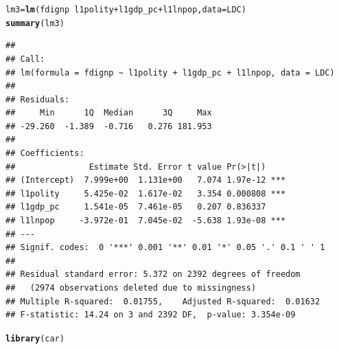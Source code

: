 \documentclass[12pt]{article}\usepackage[]{graphicx}\usepackage[]{color}
\makeatletter
\newcommand{\hlopt}[1]{\textcolor[rgb]{0,0,0}{#1}}%
\newcommand{\hlstd}[1]{\textcolor[rgb]{0.345,0.345,0.345}{#1}}%
\newcommand{\hlkwb}[1]{\textcolor[rgb]{0.69,0.353,0.396}{#1}}%
\newcommand{\hlkwc}[1]{\textcolor[rgb]{0.333,0.667,0.333}{#1}}%
\newcommand{\hlkwd}[1]{\textcolor[rgb]{0.737,0.353,0.396}{\textbf{#1}}}%
\newenvironment{kframe}{%
 \def\at@end@of@kframe{}%
 \ifinner\ifhmode%
  \def\at@end@of@kframe{\end{minipage}}%
  \begin{minipage}{\columnwidth}%
 \fi\fi%
 \def\FrameCommand##1{\hskip\@totalleftmargin \hskip-\fboxsep
 \colorbox{shadecolor}{##1}\hskip-\fboxsep
     \hskip-\linewidth \hskip-\@totalleftmargin \hskip\columnwidth}%
 \MakeFramed {\advance\hsize-\width
   \@totalleftmargin\z@ \linewidth\hsize
   \@setminipage}}%
 {\par\unskip\endMakeFramed%
 \at@end@of@kframe}
\newenvironment{knitrout}{}{} %
\makeatother
\begin{document}
\begin{knitrout}
\color{fgcolor}\begin{kframe}
\begin{alltt}
\hlstd{lm3} \hlkwb{=} \hlkwd{lm}\hlstd{(fdignp} \hlopt{~} \hlstd{l1polity} \hlopt{+} \hlstd{l1gdp_pc} \hlopt{+} \hlstd{l1lnpop,} \hlkwc{data} \hlstd{= LDC)}
\hlkwd{summary}\hlstd{(lm3)}
\end{alltt}
\begin{verbatim}
## 
## Call:
## lm(formula = fdignp ~ l1polity + l1gdp_pc + l1lnpop, data = LDC)
## 
## Residuals:
##     Min      1Q  Median      3Q     Max 
## -29.260  -1.389  -0.716   0.276 181.953 
## 
## Coefficients:
##               Estimate Std. Error t value Pr(>|t|)    
## (Intercept)  7.999e+00  1.131e+00   7.074 1.97e-12 ***
## l1polity     5.425e-02  1.617e-02   3.354 0.000808 ***
## l1gdp_pc     1.541e-05  7.461e-05   0.207 0.836337    
## l1lnpop     -3.972e-01  7.045e-02  -5.638 1.93e-08 ***
## ---
## Signif. codes:  0 '***' 0.001 '**' 0.01 '*' 0.05 '.' 0.1 ' ' 1
## 
## Residual standard error: 5.372 on 2392 degrees of freedom
##   (2974 observations deleted due to missingness)
## Multiple R-squared:  0.01755,	Adjusted R-squared:  0.01632 
## F-statistic: 14.24 on 3 and 2392 DF,  p-value: 3.354e-09
\end{verbatim}
\begin{alltt}
\hlkwd{library}\hlstd{(car)}
\end{alltt}



\end{kframe}
\end{knitrout}
\end{document}
